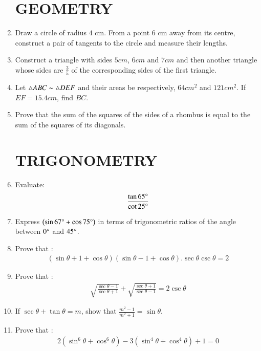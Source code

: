 \documentclass[2pt,-letter paper]{article}
\providecommand{\brak}[1]{\ensuremath{\left(#1\right)}}
\begin{document}
\begin{enumerate}
\section{GEOMETRY}
\item Draw a circle of radius $4$ cm. From a point $6$ cm away from its centre, construct a pair of tangents to the circle and measure their lengths.
\item Construct a triangle with sides $5cm$, $6cm$ and $7cm$ and then another triangle whose sides are $\frac{3}{5}$ of the corresponding sides of the first triangle.
\item Let $\triangle ABC  \thicksim  \triangle DEF$  and their areas be respectively, $64cm^2$ and $121cm^2$. If $EF=15.4cm$, find $BC$.
\item Prove that the sum of the squares of the sides of a rhombus is equal to the sum of the squares of its diagonals. 

\section{TRIGONOMETRY}
\item  Evaluate:
\begin{align*}
    \frac {\tan 65\degree}  {\cot 25\degree}
\end{align*}

\item Express $\brak{{\sin 67\degree}+ {\cos 75\degree}}$ in terms of trigonometric ratios of the angle between $0\degree$ and $45\degree$.

\item Prove that :
\begin{align*}
    \brak{\sin \theta+1+\cos \theta} \brak{\sin\theta-1+\cos\theta}.\sec\theta \csc\theta=2
\end{align*}

\item Prove that :
\begin{align*}
      \sqrt{\frac{\sec\theta-1}{\sec\theta+1}} + \sqrt{\frac{\sec\theta+1}{\sec\theta-1}} = 2\csc\theta
\end{align*}

\item If $\sec\theta + \tan\theta=m$, show that $\frac{m^2-1}{m^2+1} = \sin\theta$.

\item Prove that :
\begin{align*}
    2 (\sin^6\theta +\cos^6\theta) - 3 (\sin^4\theta + \cos^4\theta) + 1 = 0
\end{align*}


\end{enumerate}
\end{document}
